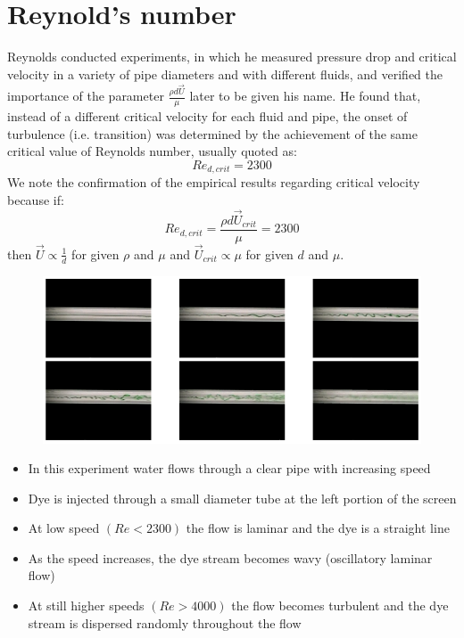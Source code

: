 \documentclass[class=report, crop=false, 12pt,a4paper]{standalone}
\begin{document}
\section{Reynold's number}
Reynolds conducted experiments, in which he measured pressure drop and critical velocity in a variety of pipe diameters and with different fluids, and verified the importance of the parameter $\frac{\rho d \vec{U}}{\mu}$ later to be given his name. He found that, instead of a different critical velocity for each fluid and pipe, the onset of turbulence (i.e. transition) was determined by the achievement of the same critical value of Reynolds number, usually quoted as:
\begin{equation}
  Re_{d,crit} = 2300
\end{equation}
We note the confirmation of the empirical results regarding critical velocity because if:
\begin{equation}
  Re_{d,crit} = \frac{\rho d \vec{U}_{crit}}{\mu} = 2300
\end{equation}
then $\vec{U} \propto \frac{1}{d}$ for given $\rho$ and $\mu$ and $\vec{U}_{crit} \propto \mu$ for given $d$ and $\mu$.
\begin{figure}[H]
  \centering
  \includegraphics[width = 0.9 \textwidth]{../img/diagram78.png}
  \caption{}
\end{figure}
\begin{itemize}
  \item In this experiment water flows through a clear pipe with increasing speed
  \item Dye is injected through a small diameter tube at the left portion of the screen
  \item At low speed $ \left( Re < 2300 \right)$ the flow is laminar and the dye is a straight line
  \item As the speed increases, the dye stream becomes wavy (oscillatory laminar flow)
  \item At still higher speeds $\left(Re > 4000\right)$ the flow becomes turbulent and the dye stream is dispersed randomly throughout the flow
\end{itemize}
\end{document}
